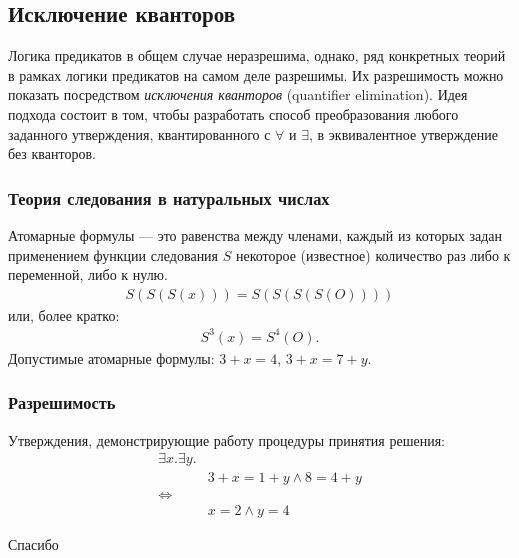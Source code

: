 \documentclass{beamer}
\begin{document}
\begin{frame}
  \section{Исключение кванторов}
  Логика предикатов в общем случае неразрешима, однако, ряд конкретных теорий в рамках логики предикатов на самом деле разрешимы. Их разрешимость можно показать посредством \textit{исключения кванторов} (quantifier elimination). Идея подхода состоит в том, чтобы разработать способ преобразования любого заданного утверждения, квантированного с $\forall$ и $\exists$, в эквивалентное утверждение без кванторов.
\end{frame}

\begin{frame}
  \frametitle{Теория следования в натуральных числах}
  Атомарные формулы --- это равенства между членами, каждый из которых задан применением функции следования $S$ некоторое (известное) количество раз либо к переменной, либо к нулю.
  \begin{align*}
    S(S(S(x))) = S(S(S(S(O))))
  \end{align*}
  или, более кратко:
  \begin{align*}
    S^3(x) = S^4(O).
  \end{align*}
  Допустимые атомарные формулы: $3 + x = 4$, $3 + x = 7 + y$.
\end{frame}

\begin{frame}
  \frametitle{Разрешимость}
  Утверждения, демонстрирующие работу процедуры принятия решения:
  \begin{align*}
    \exists x. \exists y. &
    \\
    & 3 + x = 1 + y \land 8 = 4 + y
    \\
    \iff &
    \\
    & x = 2 \land y = 4
  \end{align*}
\end{frame}

\begin{frame}
  \begin{center}
    {\Huge Спасибо}
  \end{center}
\end{frame}
\end{document}
